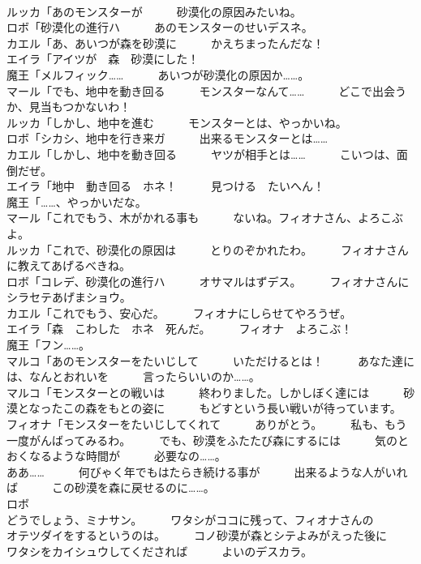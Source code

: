 \documentclass[8pt]{extreport}
\begin{document}
\begin{CJK}{UTF8}{min}
\\	ルッカ「あのモンスターが　　　砂漠化の原因みたいね。	
\\	ロボ「砂漠化の進行ハ　　　あのモンスターのせいデスネ。	
\\	カエル「あ、あいつが森を砂漠に　　　かえちまったんだな！	
\\	エイラ「アイツが　森　砂漠にした！	
\\	魔王「メルフィック……　　　あいつが砂漠化の原因か……。	
\\	マール「でも、地中を動き回る　　　モンスターなんて……　　　どこで出会うか、見当もつかないわ！	
\\	ルッカ「しかし、地中を進む　　　モンスターとは、やっかいね。	
\\	ロボ「シカシ、地中を行き来ガ　　　出来るモンスターとは……	
\\	カエル「しかし、地中を動き回る　　　ヤツが相手とは……　　　こいつは、面倒だぜ。	
\\	エイラ「地中　動き回る　ホネ！　　　見つける　たいへん！	
\\	魔王「……、やっかいだな。	
\\	マール「これでもう、木がかれる事も　　　ないね。フィオナさん、よろこぶよ。	
\\	ルッカ「これで、砂漠化の原因は　　　とりのぞかれたわ。　　　フィオナさんに教えてあげるべきね。	
\\	ロボ「コレデ、砂漠化の進行ハ　　　オサマルはずデス。　　　フィオナさんにシラセテあげまショウ。	
\\	カエル「これでもう、安心だ。　　　フィオナにしらせてやろうぜ。	
\\	エイラ「森　こわした　ホネ　死んだ。　　　フィオナ　よろこぶ！	
\\	魔王「フン……。	
\\	マルコ「あのモンスターをたいじして　　　いただけるとは！　　　あなた達には、なんとおれいを　　　言ったらいいのか……。	
\\	マルコ「モンスターとの戦いは　　　終わりました。しかしぼく達には　　　砂漠となったこの森をもとの姿に　　　もどすという長い戦いが待っています。	
\\	フィオナ「モンスターをたいじしてくれて　　　ありがとう。　　　私も、もう一度がんばってみるわ。　　　でも、砂漠をふたたび森にするには　　　気のとおくなるような時間が　　　必要なの……。	
\\	ああ……　　　何びゃく年でもはたらき続ける事が　　　出来るような人がいれば　　　この砂漠を森に戻せるのに……。	
\\	ロボ
\\	どうでしょう、ミナサン。　　　ワタシがココに残って、フィオナさんの　　　オテツダイをするというのは。　　　コノ砂漠が森とシテよみがえった後に　　　ワタシをカイシュウしてくだされば　　　よいのデスカラ。	

\end{CJK}
\end{document}
